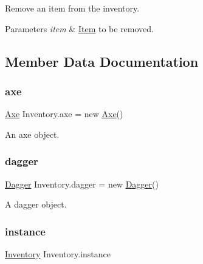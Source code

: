 Remove an item from the inventory. 


\begin{DoxyParams}{Parameters}
{\em item} & \mbox{\hyperlink{class_item}{Item}} to be removed.\\
\hline
\end{DoxyParams}


\subsection{Member Data Documentation}
\mbox{\label{class_inventory_ac7ef00d494dbe60e3e9ea30e08cd30fe}} 
\subsubsection{\texorpdfstring{axe}{axe}}
{\footnotesize\ttfamily \mbox{\hyperlink{class_axe}{Axe}} Inventory.\+axe = new \mbox{\hyperlink{class_axe}{Axe}}()\hspace{0.3cm}{\ttfamily [private]}}



An axe object. 

\mbox{\label{class_inventory_a1b8f3f640399e85ca055d2119817a2a2}} 
\subsubsection{\texorpdfstring{dagger}{dagger}}
{\footnotesize\ttfamily \mbox{\hyperlink{class_dagger}{Dagger}} Inventory.\+dagger = new \mbox{\hyperlink{class_dagger}{Dagger}}()\hspace{0.3cm}{\ttfamily [private]}}



A dagger object. 

\mbox{\label{class_inventory_ae88b8381f35fc496d2b9db36b09b962b}} 
\subsubsection{\texorpdfstring{instance}{instance}}
{\footnotesize\ttfamily \mbox{\hyperlink{class_inventory}{Inventory}} Inventory.\+instance\hspace{0.3cm}{\ttfamily [static]}}



